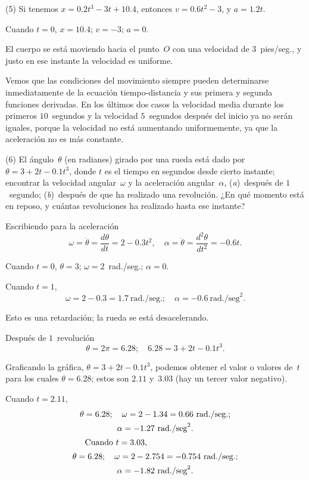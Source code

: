 \documentclass[12pt]{book}[2005/09/16]
\newcommand{\DPPageSep}[2]{\Pagelabel{#2}}
\newcommand{\Pagelabel}[1]
  {\phantomsection\label{#1}}
\begin{document}
(5) Si tenemos $x = 0.2t^3 - 3t + 10.4$, entonces $v = 0.6t^2 - 3$,
y $a = 1.2t$.

Cuando $t = 0$, $x = 10.4$; $v = -3$; $a = 0$.

El cuerpo se está moviendo hacia el punto~$O$ con
\DPPageSep{075.png}{63}%
una velocidad de $3$~pies/seg., y justo en ese instante la
velocidad es uniforme.

Vemos que las condiciones del movimiento siempre pueden
determinarse inmediatamente de la ecuación tiempo-distancia
y sus primera y segunda funciones derivadas. En los
últimos dos casos la velocidad media durante los primeros
$10$~segundos y la velocidad $5$~segundos después del inicio
ya no serán iguales, porque la velocidad no está
aumentando uniformemente, ya que la aceleración no es más
constante.

(6) El ángulo~$\theta$ (en radianes) girado por una
rueda está dado por $\theta = 3 + 2t - 0.1t^3$, donde $t$ es el
tiempo en segundos desde cierto instante; encontrar la
velocidad angular~$\omega$ y la aceleración angular~$\alpha$,
(\textit{a})~después de $1$~segundo; (\textit{b})~después de que ha realizado una
revolución. ¿En qué momento está en reposo, y cuántas
revoluciones ha realizado hasta ese instante?

Escribiendo para la aceleración
\[
\omega =  \dot{\theta} = \dfrac{d\theta}{dt} = 2 - 0.3t^2,\quad
\alpha = \ddot{\theta} = \dfrac{d^2\theta}{dt^2} = -0.6t.
\]

Cuando $t = 0$, $\theta = 3$; $\omega = 2$~rad./seg.; $\alpha = 0$.

Cuando $t = 1$,
\[
\omega = 2 - 0.3 = 1.7~\text{rad./seg.};\quad \alpha = -0.6~\text{rad./seg}^2.
\]

Esto es una retardación; la rueda se está desacelerando.

Después de $1$~revolución
\[
\theta = 2\pi = 6.28;\quad 6.28 = 3 + 2t - 0.1t^3.
\]

Graficando la gráfica, $\theta = 3 + 2t - 0.1t^3$, podemos obtener
el valor o valores de~$t$ para los cuales $\theta = 6.28$; estos
son $2.11$ y~$3.03$ (hay un tercer valor negativo).
\DPPageSep{076.png}{64}%

Cuando $t = 2.11$,
\begin{gather*}
\theta = 6.28;\quad\omega = 2 - 1.34 = 0.66 \text{ rad./seg.}; \\
\alpha = -1.27 \text{ rad./seg}^2. \\
\intertext{\indent Cuando $t = 3.03$,}
\theta = 6.28;\quad \omega = 2 - 2.754 = -0.754 \text{ rad./seg.}; \\
\alpha = -1.82 \text{ rad./seg}^2.
\end{gather*}
\end{document}
